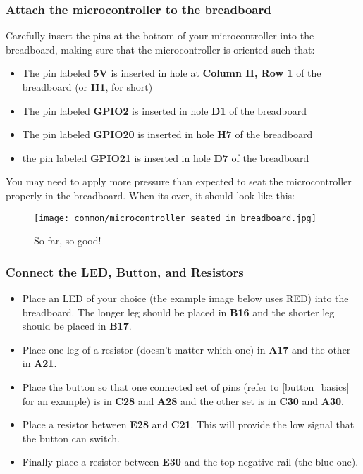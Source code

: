 \subsubsection{Attach the microcontroller to the breadboard}
Carefully insert the pins at the bottom of your microcontroller into the breadboard, making sure that the microcontroller is oriented such that:
\begin{itemize}
    \item The pin labeled \textbf{5V} is inserted in hole at \textbf{Column H, Row 1} of the breadboard (or \textbf{H1}, for short)
    \item The pin labeled \textbf{GPIO2} is inserted in hole \textbf{D1} of the breadboard
    \item The pin labeled \textbf{GPIO20} is inserted in hole \textbf{H7} of the breadboard
    \item the pin labeled \textbf{GPIO21} is inserted in hole \textbf{D7} of the breadboard
\end{itemize}
You may need to apply more pressure than expected to seat the microcontroller properly in the breadboard. When its over, it should look like this:

\begin{figure}[H]
    \centering
    \texttt{[image: common/microcontroller\_seated\_in\_breadboard.jpg]}
    \caption{So far, so good!}
\end{figure}

\subsubsection{Connect the LED, Button, and Resistors}
\begin{itemize}
    \item Place an LED of your choice (the example image below uses RED) into the breadboard. The longer leg
    should be placed in \textbf{B16} and the shorter leg should be placed in \textbf{B17}.
    \item Place one leg of a resistor (doesn't matter which one) in \textbf{A17} and the other in
    \textbf{A21}.
    \item Place the button so that one connected set of pins (refer to \ref{button_basics} for an
    example) is in \textbf{C28} and \textbf{A28} and the other set is in \textbf{C30} and \textbf{A30}.
    \item Place a resistor between \textbf{E28} and \textbf{C21}. This will provide the low signal that
    the button can switch.
    \item Finally place a resistor between \textbf{E30} and the top negative rail (the blue one).
\end{itemize}

